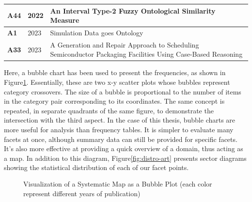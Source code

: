 {\begin{longtable}{ | m{1cm} | m{1.5cm} | m{12cm} | }
                    \hline
                    \textbf{A44} &2022 &An Interval Type-2 Fuzzy Ontological Similarity Measure \cite{adel2022interval} \\
                    \hline
                    \textbf{A1} &2023 &Simulation Data goes Ontology \cite{spelten2023simulation} \\
                    \hline
                    \textbf{A33} &2023 &A Generation and Repair Approach to Scheduling Semiconductor Packaging Facilities Using Case-Based Reasoning \cite{park2023generation} \\
                    \hline
                \end{longtable}}
            
            Here, a bubble chart has been used to present the frequencies, as shown in Figure\ref{fig:viz-smb}. Essentially, these are two x-y scatter plots whose bubbles represent category crossovers. The size of a bubble is proportional to the number of items in the category pair corresponding to its coordinates. The same concept is repeated, in separate quadrants of the same figure, to demonstrate the intersection with the third aspect. In the case of this thesis, bubble charts are more useful for analysis than frequency tables. It is simpler to evaluate many facets at once, although summary data can still be provided for specific facets. It's also more effective at providing a quick overview of a domain, thus acting as a map. In addition to this diagram, Figure\ref{fig:distro-art} presents sector diagrams showing the statistical distribution of each of our facet points.

            
            \begin{figure}[h]
            \centering
            \caption{\label{fig:viz-smb}  Visualization of a Systematic Map as a Bubble Plot (each color represent different years of publication)}
            \end{figure}

